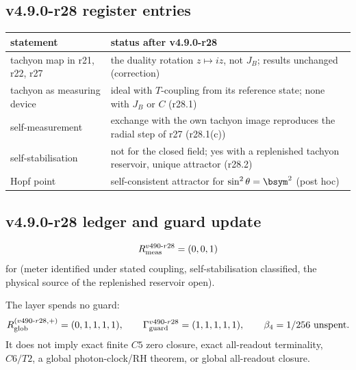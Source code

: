 \subsection*{v4.9.0-r28 register entries}
\label{subsec:v490-r28-register}

\begin{center}
\small
\begin{tabular}{@{}>{\raggedright\arraybackslash}p{}>{\raggedright\arraybackslash}p{}@{}}
\toprule
statement & status after v4.9.0-r28\\
\midrule
tachyon map in r21, r22, r27 & the duality rotation \(z\mapsto iz\), not \(J_B\); results unchanged (correction)\\
tachyon as measuring device & ideal with \(T\)-coupling from its reference state; none with \(J_B\) or \(C\) (r28.1)\\
self-measurement & exchange with the own tachyon image reproduces the radial step of r27 (r28.1(c))\\
self-stabilisation & not for the closed field; yes with a replenished tachyon reservoir, unique attractor (r28.2)\\
Hopf point & self-consistent attractor for \(\sin^2\theta=\bsym^2\) (post hoc)\\
\bottomrule
\end{tabular}
\end{center}

\subsection*{v4.9.0-r28 ledger and guard update}
\label{subsec:v490-r28-ledger-guard}

\[
R_{\rm meas}^{v490\text{-}r28}=(0,0,1)
\]
for (meter identified under stated coupling, self-stabilisation classified, the physical source of the replenished reservoir open).

The layer spends no guard:
\[
R_{\rm glob}^{(v490\text{-}r28,+)}=(0,1,1,1,1),
\qquad
\Gamma_{\rm guard}^{v490\text{-}r28}=(1,1,1,1,1),
\qquad
\beta_4=1/256\ \text{unspent}.
\]
It does not imply exact finite \(C5\) zero closure, exact all-readout terminality,
\(C6/T2\), a global photon-clock/RH theorem, or global all-readout closure.

